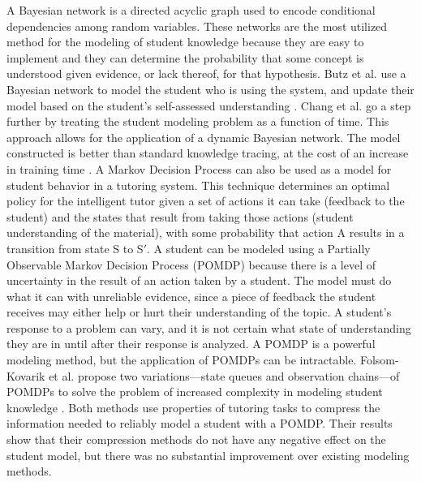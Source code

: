 A Bayesian network is a directed acyclic graph used to encode conditional dependencies among random variables. These networks are the most utilized method for the modeling of student knowledge because they are easy to implement and they can determine the probability that some concept is understood given evidence, or lack thereof, for that hypothesis. Butz et al. use a Bayesian network to model the student who is using the system, and update their model based on the student's self-assessed understanding \cite{Butz2004}. Chang et al. go a step further by treating the student modeling problem as a function of time. This approach allows for the application of a dynamic Bayesian network. The model constructed is better than standard knowledge tracing, at the cost of an increase in training time \cite{Chang2006}.
A Markov Decision Process can also be used as a model for student behavior in a tutoring system. This technique determines an optimal policy for the intelligent tutor given a set of actions it can take (feedback to the student) and the states that result from taking those actions (student understanding of the material), with some probability that action A results in a transition from state S to S$'$. A student can be modeled using a Partially Observable Markov Decision Process (POMDP) because there is a level of uncertainty in the result of an action taken by a student. The model must do what it can with unreliable evidence, since a piece of feedback the student receives may either help or hurt their understanding of the topic. A student's response to a problem can vary, and it is not certain what state of understanding they are in until after their response is analyzed. A POMDP is a powerful modeling method, but the application of POMDPs can be intractable. Folsom-Kovarik et al. propose two variations---state queues and observation chains---of POMDPs to solve the problem of increased complexity in modeling student knowledge \cite{Folsom-Kovarik2013}. Both methods use properties of tutoring tasks to compress the information needed to reliably model a student with a POMDP. Their results show that their compression methods do not have any negative effect on the student model, but there was no substantial improvement over existing modeling methods.


